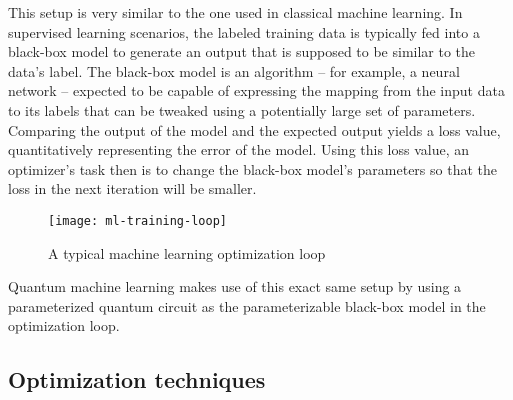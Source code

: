 This setup is very similar to the one used in classical machine learning.
In supervised learning scenarios, the labeled training data is typically fed
into a black-box model to generate an output that is supposed to be similar to
the data's label.
The black-box model is an algorithm -- for example, a neural network -- expected
to be capable of expressing the mapping from the input data to its labels that
can be tweaked using a potentially large set of parameters.
Comparing the output of the model and the expected output yields a loss value,
quantitatively representing the error of the model.
Using this loss value, an optimizer's task then is to change the black-box
model's parameters so that the loss in the next iteration will be smaller.

\begin{figure}[h]
    \label{fig:ml-training-loop}
    \centering
    \texttt{[image: ml-training-loop]}
    \caption{A typical machine learning optimization loop}
\end{figure}

Quantum machine learning makes use of this exact same setup by using a
parameterized quantum circuit as the parameterizable black-box model in the
optimization loop.

\subsection{Optimization techniques}

